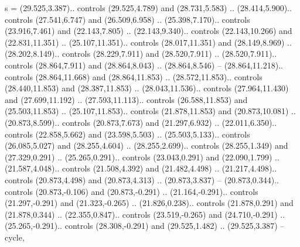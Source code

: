 {s} = {(29.525,3.387).. controls (29.525,4.789) and (28.731,5.583) .. (28.414,5.900).. controls (27.541,6.747) and (26.509,6.958) .. (25.398,7.170).. controls (23.916,7.461) and (22.143,7.805) .. (22.143,9.340).. controls (22.143,10.266) and (22.831,11.351) .. (25.107,11.351).. controls (28.017,11.351) and (28.149,8.969) .. (28.202,8.149).. controls (28.229,7.911) and (28.520,7.911) .. (28.520,7.911).. controls (28.864,7.911) and (28.864,8.043) .. (28.864,8.546) -- (28.864,11.218).. controls (28.864,11.668) and (28.864,11.853) .. (28.572,11.853).. controls (28.440,11.853) and (28.387,11.853) .. (28.043,11.536).. controls (27.964,11.430) and (27.699,11.192) .. (27.593,11.113).. controls (26.588,11.853) and (25.503,11.853) .. (25.107,11.853).. controls (21.878,11.853) and (20.873,10.081) .. (20.873,8.599).. controls (20.873,7.673) and (21.297,6.932) .. (22.011,6.350).. controls (22.858,5.662) and (23.598,5.503) .. (25.503,5.133).. controls (26.085,5.027) and (28.255,4.604) .. (28.255,2.699).. controls (28.255,1.349) and (27.329,0.291) .. (25.265,0.291).. controls (23.043,0.291) and (22.090,1.799) .. (21.587,4.048).. controls (21.508,4.392) and (21.482,4.498) .. (21.217,4.498).. controls (20.873,4.498) and (20.873,4.313) .. (20.873,3.837) -- (20.873,0.344).. controls (20.873,-0.106) and (20.873,-0.291) .. (21.164,-0.291).. controls (21.297,-0.291) and (21.323,-0.265) .. (21.826,0.238).. controls (21.878,0.291) and (21.878,0.344) .. (22.355,0.847).. controls (23.519,-0.265) and (24.710,-0.291) .. (25.265,-0.291).. controls (28.308,-0.291) and (29.525,1.482) .. (29.525,3.387) -- cycle},
